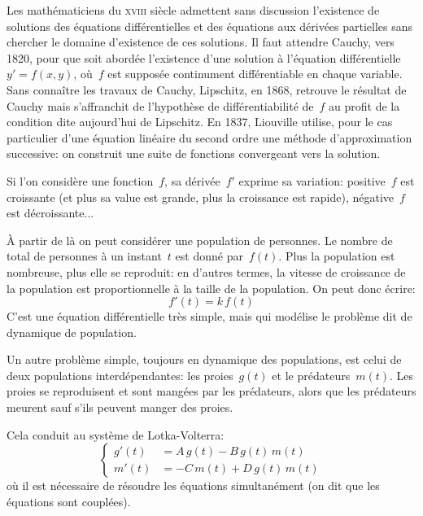 \medskip
Les mathématiciens du \textsc{xviii} siècle admettent sans discussion l'existence de solutions des équations différentielles et des équations aux dérivées partielles sans chercher le domaine d'existence de ces solutions. Il faut attendre Cauchy, vers 1820, pour que soit abordée l'existence d'une solution à l'équation différentielle~$y' = f(x,y)$, où~$f$ est supposée continument différentiable en chaque variable. Sans connaître les travaux de Cauchy, Lipschitz, en 1868, retrouve le résultat de Cauchy mais s'affranchit de l'hypothèse de différentiabilité de~$f$ au profit de la condition dite aujourd'hui de Lipschitz. En 1837, Liouville utilise, pour le cas particulier d'une équation linéaire du second ordre une méthode d'approximation successive: on construit une suite de fonctions convergeant vers la solution.


\medskip
Si l'on considère une fonction~$f$, sa dérivée~$f'$ exprime sa variation: positive~$f$ est croissante (et plus sa value est grande, plus la croissance est rapide), négative~$f$ est décroissante...

À partir de là on peut considérer une population de personnes. Le nombre de total de personnes à un instant~$t$ est donné par~$f(t)$. Plus la population est nombreuse, plus elle se reproduit: en d'autres termes, la vitesse de croissance de la population est proportionnelle à la taille de la population. On peut donc écrire:
\begin{equation}
f'(t)=k\,f(t)\end{equation}
C'est une équation différentielle très simple, mais qui modélise le problème dit de dynamique de population.

\medskip
Un autre problème simple, toujours en dynamique des populations, est celui de deux populations interdépendantes: les proies~$g(t)$ et le prédateurs~$m(t)$. Les proies se reproduisent et sont mangées par les prédateurs, alors que les prédateurs meurent sauf s'ils peuvent manger des proies.

Cela conduit au système de Lotka-Volterra:
\begin{equation}%
  \begin{cases} g'(t)&=A\,g(t)-B\,g(t)\,m(t) \\ m'(t)&=-C\,m(t)+D\,g(t)\,m(t) \end{cases} 
\end{equation}
où il est nécessaire de résoudre les équations simultanément (on dit que les équations sont couplées).

